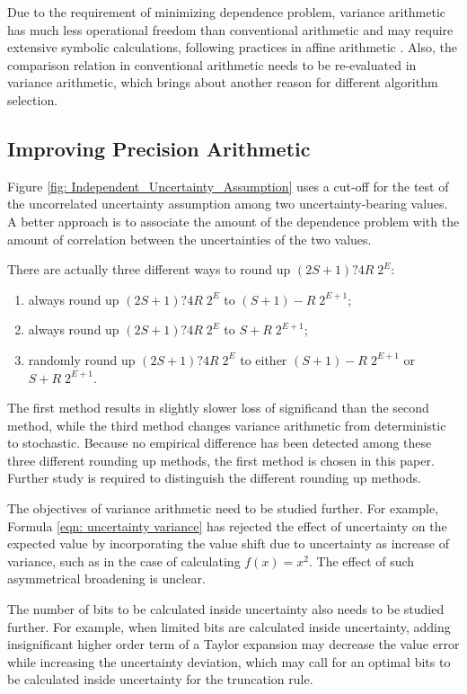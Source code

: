 \documentclass[twoside]{article}
\numberwithin{equation}{section}
\begin{document}
Due to the requirement of minimizing dependence problem, variance arithmetic has much less operational freedom than conventional arithmetic and may require extensive symbolic calculations, following practices in affine arithmetic \cite{Symbolic_Affine_Arithmetic}.  Also, the comparison relation in conventional arithmetic needs to be re-evaluated in variance arithmetic, which brings about another reason for different algorithm selection.


\subsection{Improving Precision Arithmetic}

Figure \ref{fig: Independent_Uncertainty_Assumption} uses a cut-off for the test of the uncorrelated uncertainty assumption among two uncertainty-bearing values.  A better approach is to associate the amount of the dependence problem with the amount of correlation between the uncertainties of the two values.  

There are actually three different ways to round up $(2S+1)?4R\; 2^E$:
\begin{enumerate}
\item always round up $(2S+1)?4R\; 2^E$ to $(S+1)-R\; 2^{E+1}$;
\item always round up $(2S+1)?4R\; 2^E$ to $S+R\; 2^{E+1}$;
\item randomly round up $(2S+1)?4R\; 2^E$ to either $(S+1)-R\; 2^{E+1}$ or $S+R\; 2^{E+1}$.
\end{enumerate}
The first method results in slightly slower loss of significand than the second method, while the third method changes variance arithmetic from deterministic to stochastic.  Because no empirical difference has been detected among these three different rounding up methods, the first method is chosen in this paper. Further study is required to distinguish the different rounding up methods.

The objectives of variance arithmetic need to be studied further.  For example, Formula \eqref{eqn: uncertainty variance} has rejected the effect of uncertainty on the expected value by incorporating the value shift due to uncertainty as increase of variance, such as in the case of calculating $f(x) = x^{2}$.  The effect of such asymmetrical broadening is unclear.  

The number of bits to be calculated inside uncertainty also needs to be studied further.  For example, when limited bits are calculated inside uncertainty, adding insignificant higher order term of a Taylor expansion may decrease the value error while increasing the uncertainty deviation, which may call for an optimal bits to be calculated inside uncertainty for the truncation rule.  
\end{document}
